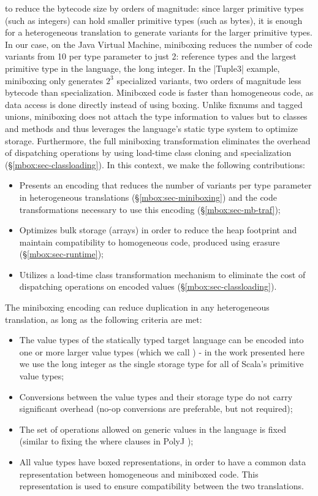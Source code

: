  to reduce the bytecode size by orders of magnitude: since larger primitive types (such as integers) can hold smaller primitive types (such as bytes), it is enough for a heterogeneous translation to generate variants for the larger primitive types. In our case, on the Java Virtual Machine, miniboxing reduces the number of code variants from 10 per type parameter to just 2: reference types and the largest primitive type in the language, the long integer. In the |Tuple3| example, miniboxing only generates $2^3$ specialized variants, two orders of magnitude less bytecode than specialization. Miniboxed code is faster than homogeneous code, as data access is done directly instead of using boxing. Unlike fixnums and tagged unions, miniboxing does not attach the type information to values but to classes and methods and thus leverages the language's static type system to optimize storage. Furthermore, the full miniboxing transformation eliminates the overhead of dispatching operations by using load-time class cloning and specialization (\S\ref{mbox:sec-classloading}). In this context, we make the following contributions:

\begin{itemize}
  \item Presents an encoding that reduces the number of variants per type parameter in heterogeneous translations (\S{}\ref{mbox:sec-miniboxing}) and the code transformations necessary to use this encoding (\S\ref{mbox:sec-mb-traf});
  \item Optimizes bulk storage (arrays) in order to reduce the heap footprint and maintain compatibility to homogeneous code, produced using erasure (\S{}\ref{mbox:sec-runtime});
  \item Utilizes a load-time class transformation mechanism to eliminate the cost of dispatching operations on encoded values (\S{}\ref{mbox:sec-classloading}).
\end{itemize}

The miniboxing encoding can reduce duplication in any heterogeneous translation, as long as the following criteria are met:
\begin{itemize}
  \item The value types of the statically typed target language can be encoded into one or more larger value types (which we call ) - in the work presented here we use the long integer as the single storage type for all of Scala's primitive value types;
  \item Conversions between the value types and their storage type do not carry significant overhead (no-op conversions are preferable, but not required);
  \item The set of operations allowed on generic values in the language is fixed (similar to fixing the where clauses in PolyJ \cite{myers-polyj});
  \item All value types have boxed representations, in order to have a common data representation between homogeneous and miniboxed code. This representation is used to ensure compatibility between the two translations.
\end{itemize}

